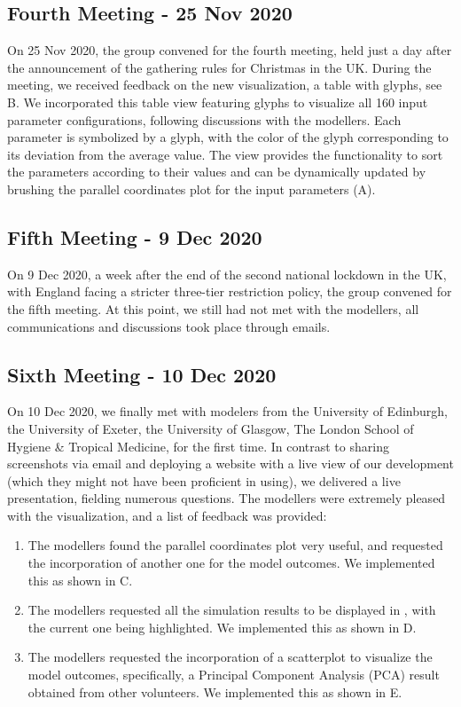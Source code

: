 \subsection{Fourth Meeting - 25 Nov 2020}
On 25 Nov 2020, the group convened for the fourth meeting, held just a day after the announcement of the gathering rules for Christmas in the UK.
During the meeting, we received feedback on the new visualization, a table with glyphs, see B. We incorporated this table view featuring glyphs to visualize all 160 input parameter configurations, following discussions with the modellers.
Each parameter is symbolized by a glyph, with the color of the glyph corresponding to its deviation from the average value.
The view provides the functionality to sort the parameters according to their values and can be dynamically updated by brushing the parallel coordinates plot for the input parameters (A).

\subsection{Fifth Meeting - 9 Dec 2020}
On 9 Dec 2020, a week after the end of the second national lockdown in the UK, with England facing a stricter three-tier restriction policy, the group convened for the fifth meeting.
At this point, we still had not met with the modellers, all communications and discussions took place through emails.

\subsection{Sixth Meeting - 10 Dec 2020}
On 10 Dec 2020, we finally met with modelers from the University of Edinburgh, the University of Exeter, the University of Glasgow, The London School of Hygiene \& Tropical Medicine, for the first time.
In contrast to sharing screenshots via email and deploying a website with a live view of our development (which they might not have been proficient in using), we delivered a live presentation, fielding numerous questions.
The modellers were extremely pleased with the visualization, and a list of feedback was provided:
\begin{enumerate}
    \item The modellers found the parallel coordinates plot very useful, and requested the incorporation of another one for the model outcomes. We implemented this as shown in C.
    \item The modellers requested all the simulation results to be displayed in , with the current one being highlighted. We implemented this as shown in D.
    \item The modellers requested the incorporation of a scatterplot to visualize the model outcomes, specifically, a Principal Component Analysis (PCA) result obtained from other volunteers. We implemented this as shown in E.
\end{enumerate}

